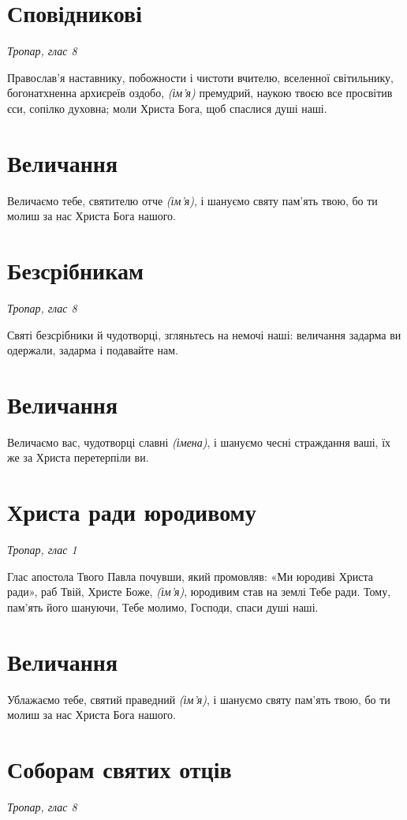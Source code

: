 \documentclass[chapters.tex]{subfiles}
\begin{document}
\section{Сповідникові}
\emph{Тропар, глас 8}

Православ’я наставнику, побожности і чистоти вчителю, вселенної світильнику, богонатхненна архиєреїв оздобо, \emph{(ім’я)} премудрий, наукою твоєю все просвітив єси, сопілко духовна; моли Христа Бога, щоб спаслися душі наші.

\section{Величання}

Величаємо тебе, святителю отче \emph{(ім’я)}, і шануємо святу пам’ять твою, бо ти молиш за нас Христа Бога нашого.

\section{Безсрібникам}
\emph{Тропар, глас 8}

Святі безсрібники й чудотворці, згляньтесь на немочі наші: величання задарма ви одержали, задарма і подавайте нам.

\section{Величання}

Величаємо вас, чудотворці славні \emph{(імена)}, і шануємо чесні страждання ваші, їх же за Христа перетерпіли ви.

\section{Христа ради юродивому}
\emph{Тропар, глас 1}

Глас апостола Твого Павла почувши, який промовляв: «Ми юродиві Христа ради», раб Твій, Христе Боже, \emph{(ім’я)}, юродивим став на землі Тебе ради. Тому, пам’ять його шануючи, Тебе молимо, Господи, спаси душі наші.

\section{Величання}

Ублажаємо тебе, святий праведний \emph{(ім’я)}, і шануємо святу пам’ять твою, бо ти молиш за нас Христа Бога нашого.

\section{Соборам святих отців}
\emph{Тропар, глас 8}
\end{document}

